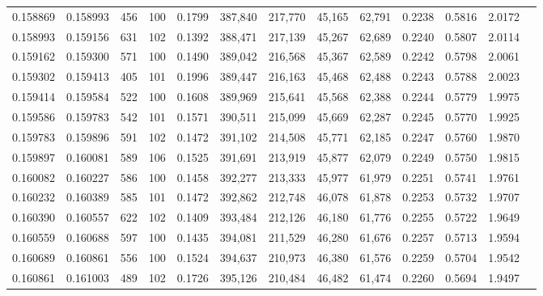 \begin{tabular}{rrrrrrrrrrrrr}
0.158869 & 0.158993 &   456 & 100 &                                     0.1799 & 387,840 & 217,770 &  45,165 &  62,791 & 0.2238 & 0.5816 & 2.0172 \\
0.158993 & 0.159156 &   631 & 102 &                                     0.1392 & 388,471 & 217,139 &  45,267 &  62,689 & 0.2240 & 0.5807 & 2.0114 \\
0.159162 & 0.159300 &   571 & 100 &                                     0.1490 & 389,042 & 216,568 &  45,367 &  62,589 & 0.2242 & 0.5798 & 2.0061 \\
0.159302 & 0.159413 &   405 & 101 &                                     0.1996 & 389,447 & 216,163 &  45,468 &  62,488 & 0.2243 & 0.5788 & 2.0023 \\
0.159414 & 0.159584 &   522 & 100 &                                     0.1608 & 389,969 & 215,641 &  45,568 &  62,388 & 0.2244 & 0.5779 & 1.9975 \\
0.159586 & 0.159783 &   542 & 101 &                                     0.1571 & 390,511 & 215,099 &  45,669 &  62,287 & 0.2245 & 0.5770 & 1.9925 \\
0.159783 & 0.159896 &   591 & 102 &                                     0.1472 & 391,102 & 214,508 &  45,771 &  62,185 & 0.2247 & 0.5760 & 1.9870 \\
0.159897 & 0.160081 &   589 & 106 &                                     0.1525 & 391,691 & 213,919 &  45,877 &  62,079 & 0.2249 & 0.5750 & 1.9815 \\
0.160082 & 0.160227 &   586 & 100 &                                     0.1458 & 392,277 & 213,333 &  45,977 &  61,979 & 0.2251 & 0.5741 & 1.9761 \\
0.160232 & 0.160389 &   585 & 101 &                                     0.1472 & 392,862 & 212,748 &  46,078 &  61,878 & 0.2253 & 0.5732 & 1.9707 \\
0.160390 & 0.160557 &   622 & 102 &                                     0.1409 & 393,484 & 212,126 &  46,180 &  61,776 & 0.2255 & 0.5722 & 1.9649 \\
0.160559 & 0.160688 &   597 & 100 &                                     0.1435 & 394,081 & 211,529 &  46,280 &  61,676 & 0.2257 & 0.5713 & 1.9594 \\
0.160689 & 0.160861 &   556 & 100 &                                     0.1524 & 394,637 & 210,973 &  46,380 &  61,576 & 0.2259 & 0.5704 & 1.9542 \\
0.160861 & 0.161003 &   489 & 102 &                                     0.1726 & 395,126 & 210,484 &  46,482 &  61,474 & 0.2260 & 0.5694 & 1.9497 \\

\end{tabular}
